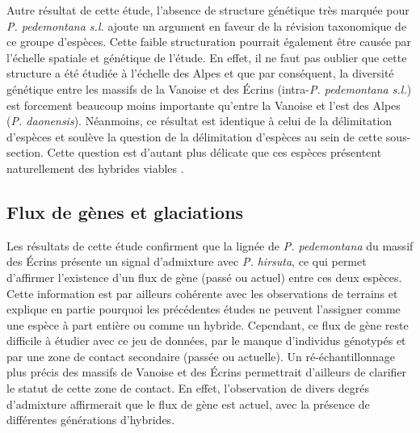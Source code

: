
Autre résultat de cette étude, l'absence de structure génétique très marquée pour \textit{P. pedemontana s.l.} ajoute un argument en faveur de la révision taxonomique de ce groupe d'espèces. Cette faible structuration pourrait également être causée par l'échelle spatiale et génétique de l'étude. En effet, il ne faut pas oublier que cette structure a été étudiée à l'échelle des Alpes et que par conséquent, la diversité génétique entre les massifs de la Vanoise et des Écrins (intra-\textit{P. pedemontana s.l.}) est forcement beaucoup moins importante qu'entre la Vanoise et l'est des Alpes (\textit{P. daonensis}). Néanmoins, ce résultat est identique à celui de la délimitation d'espèces \citep{Boucher2016a} et soulève la question de la délimitation d'espèces au sein de cette sous-section. Cette question est d'autant plus délicate que ces espèces présentent naturellement des hybrides viables \citep{Schorr2012}.

\subsection{Flux de gènes et glaciations}

Les résultats de cette étude confirment que la lignée de \textit{P. pedemontana} du massif des Écrins présente un signal d'admixture avec \textit{P. hirsuta}, ce qui permet d'affirmer l'existence d'un flux de gène (passé ou actuel) entre ces deux espèces. Cette information est par ailleurs cohérente avec les observations de terrains et explique en partie pourquoi les précédentes études ne peuvent l'assigner comme une espèce à part entière ou comme un hybride. Cependant, ce flux de gène reste difficile à étudier avec ce jeu de données, par le manque d'individus génotypés et par une zone de contact secondaire (passée ou actuelle). Un ré-échantillonnage plus précis des massifs de Vanoise et des Écrins permettrait d'ailleurs de clarifier le statut de cette zone de contact. En effet, l'observation de divers degrés d'admixture affirmerait que le flux de gène est actuel, avec la présence de différentes générations d'hybrides.

